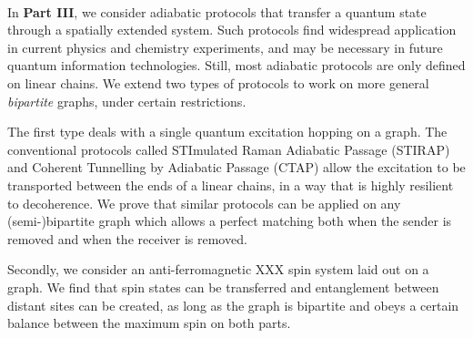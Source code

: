 \paragraph{} 
In \textbf{Part III}, we consider adiabatic protocols that transfer a quantum state through a spatially extended system. Such protocols find widespread application in current physics and chemistry experiments, and may be necessary in future quantum information technologies. Still, most adiabatic protocols are only defined on linear chains. We extend two types of protocols to work on more general \emph{bipartite} graphs, under certain restrictions. 

The first type deals with a single quantum excitation hopping on a graph. The conventional protocols called STImulated Raman Adiabatic Passage (STIRAP) and Coherent Tunnelling by Adiabatic Passage (CTAP) allow the excitation to be transported between the ends of a linear chains, in a way that is highly resilient to decoherence. We prove that similar protocols can be applied on any (semi-)bipartite graph which allows a perfect matching both when the sender is removed and when the receiver is removed.

Secondly, we consider an anti-ferromagnetic XXX spin system laid out on a graph. We find that spin states can be transferred and entanglement between distant sites can be created, as long as the graph is bipartite and obeys a certain balance between the maximum spin on both parts.
\vfill